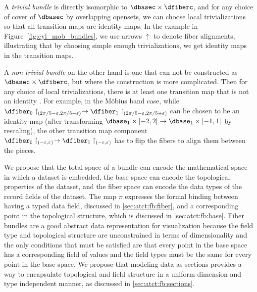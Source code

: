 \documentclass[journal]{IEEEtran}
\theoremstyle{definition}
\theoremstyle{remark}
\begin{document}
A \textit{trivial bundle} is directly isomorphic to $\dbasec\times\dfiberc$, and for any choice of cover of $\dbasec$ by overlapping opensets, we can choose local trivializations so that all transition maps are identity maps. In the example in Figure~\ref{fig:cyl_mob_bundles}, we use arrows $\uparrow$ to denote fiber alignments, illustrating that by choosing simple enough trivializations, we get identity maps in the transition maps.


A \textit{non-trivial bundle} on the other hand is one that can not be constructed as $\dbasec\times\dfiberc$, but where the construction is more complicated. Then for any choice of local trivializations, there is at least one transition map that is not an identity \cite{hatcherAlgebraicTopology2002}. For example, in the Möbius band case, while $\dfiber_0\restriction_{(2\pi/5-\varepsilon, 2\pi/5+\varepsilon)}\to\dfiber_1\restriction_{(2\pi/5-\varepsilon, 2\pi/5+\varepsilon)}$ can be chosen to be an identity map (after transforming $\dbase_1\times[-2,2]\to\dbase_1\times[-1,1]$ by rescaling), the other transition map component $\dfiber_0\restriction_{(-\varepsilon,\varepsilon)}\to\dfiber_1\restriction_{(-\varepsilon,\varepsilon)}$ has to flip the fibers to align them between the pieces.


We propose that the total space of a bundle can encode the mathematical space in which a  dataset is embedded, the base space can encode the topological properties of the dataset, and the fiber space can encode the data types of the record fields of the dataset. The map $\pi$ expresses the formal binding between having a typed data field, discussed in \autoref{sec:atct:fb:fiber}, and a corresponding point in the topological structure, which is discussed in \autoref{sec:atct:fb:base}. Fiber bundles are a good abstract data representation for visualization because the field type and topological structure are unconstrained in terms of dimensionality and the only conditions that must be satisfied are that every point in the base space has a corresponding field of values and the field types must be the same for every point in the base space. We propose that modeling data as sections provides a way to encapsulate topological and field structure in a uniform dimension and type independent manner, as discussed in \autoref{sec:atct:fb:sections}.
\end{document}
